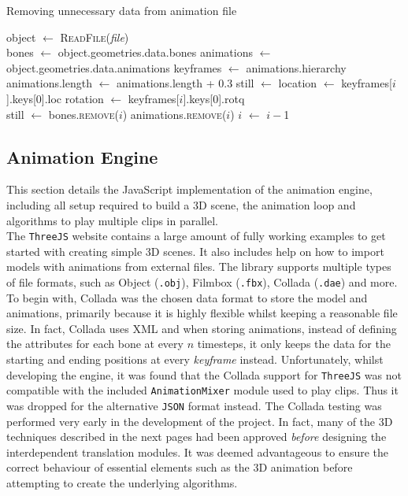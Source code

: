 \documentclass[12pt]{ociamthesis}  %
\newcommand*\Arg{\textit}
\newcommand*\func{\textsc}
\newcommand*\Let[2]{\State #1 $\gets$ #2}
\newcommand{\tech}{\texttt}
\begin{document}
\begin{algorithm}[H]
	\caption{Removing unnecessary data from animation file}
	\label{alg:convert}
	\begin{algorithmic}[1]
	    \Statex
	    \Function{Convert}{\Arg{file}}
	    		\Let{object}{\func{ReadFile}(\Arg{file})}
	    		\\
	    		\Let{bones}{object.geometries.data.bones}
	    		\Let{animations}{object.geometries.data.animations}
	    		\Let{keyframes}{animations.hierarchy}
	    		\\
	    		\Let{animations.length}{animations.length + 0.3}
				\Let{still}{\True}
				\Let{location}{keyframes[$i$].keys[0].loc}\Comment{\textcolor{com}{First timestep}}
				\Let{rotation}{keyframes[$i$].keys[0].rotq}
				\\
						\Let{still}{\False}
						\State \Break
					\EndIf
				\EndFor
				\IF{still is \True}
					\State bones.\func{remove($i$)}
					\State animations.\func{remove($i$)}
					\Let{$i$}{$i-$1}
				\EndIf
	    		\EndFor
	    		\State {}
	    	\EndFunction
	\end{algorithmic}
\end{algorithm}

\subsection{Animation Engine}
\label{engine}
This section details the JavaScript implementation of the animation engine, including all setup required to build a 3D scene, the animation loop and algorithms to play multiple clips in parallel.\\

The \tech{ThreeJS} website contains a large amount of fully working examples to get started with creating simple 3D scenes. It also includes help on how to import models with animations from external files. The library supports multiple types of file formats, such as Object (\texttt{.obj}), Filmbox (\texttt{.fbx}), Collada (\texttt{.dae}) and more. To begin with, Collada was the chosen data format to store the model and animations, primarily because it is highly flexible whilst keeping a reasonable file size. In fact, Collada uses XML and when storing animations, instead of defining the attributes for each bone at every $n$ timesteps, it only keeps the data for the starting and ending positions at every \textit{keyframe} instead. Unfortunately, whilst developing the engine, it was found that the Collada support for \tech{ThreeJS} was not compatible with the included \texttt{AnimationMixer} module used to play clips. Thus it was dropped for the alternative \tech{JSON} format instead. The Collada testing was performed very early in the development of the project. In fact, many of the 3D techniques described in the next pages had been approved \textit{before} designing the interdependent translation modules. It was deemed advantageous to ensure the correct behaviour of essential elements such as the 3D animation before attempting to create the underlying algorithms.
\end{document}
